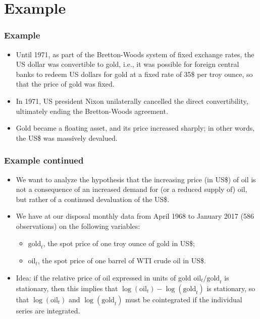 \section*{Example}
\begin{frame}\frametitle{Example}
\begin{itemize}
\item Until 1971, as part of the Bretton-Woods system of fixed exchange rates, the US dollar was convertible to gold, i.e., it was possible for foreign central banks to redeem US dollars for gold at a fixed rate of 35\$ per troy ounce, so that the price of gold was fixed.
\item In 1971, US president Nixon unilaterally cancelled the direct convertibility, ultimately ending the Bretton-Woods agreement.
\item Gold became a floating asset, and its price increased sharply; in other words, the US\$ was massively devalued.
\end{itemize}
\end{frame}
\begin{frame}\frametitle{Example continued}
\begin{itemize}
\item We want to analyze the hypothesis that the increasing price (in US\$) of oil is not a consequence of an increased demand for (or a reduced supply of) oil, but rather of a continued devaluation of the US\$.

\item We have at our disposal monthly data from April 1968 to January 2017 (586 observations) on the following variables:

\begin{itemize}
\item $\mathrm{gold}_t$, the spot price of one troy ounce of gold in US\$;

\item $\mathrm{oil}_t$, the spot price of one barrel of WTI crude oil in US\$.
\end{itemize}
\item Idea: if the relative price of oil expressed in units of gold $\mathrm{oil}_t/\mathrm{gold}_t$ is stationary, then this implies that $\log(\mathrm{oil}_t)-\log(\mathrm{gold}_t)$ is stationary, so that $\log(\mathrm{oil}_t)$ and $\log(\mathrm{gold}_t)$ must be cointegrated if the individual series are integrated.
\end{itemize}
\end{frame}
